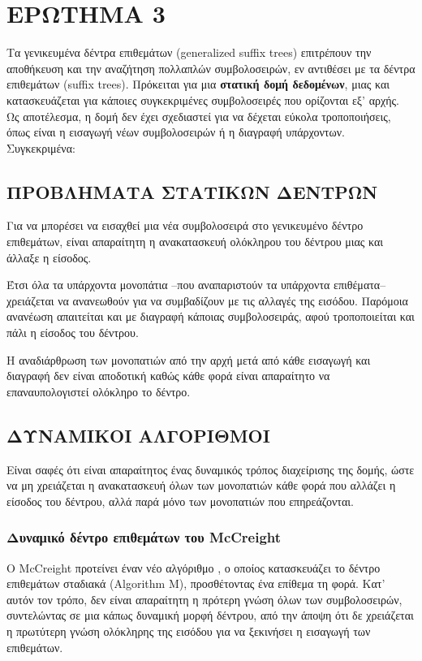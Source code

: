 \chapter{ΕΡΩΤΗΜΑ 3}

    Τα γενικευμένα δέντρα επιθεμάτων (generalized suffix trees) επιτρέπουν την αποθήκευση και την αναζήτηση πολλαπλών συμβολοσειρών, εν αντιθέσει με τα δέντρα επιθεμάτων (suffix trees).
    Πρόκειται για μια \textbf{στατική δομή δεδομένων}, μιας και κατασκευάζεται για κάποιες συγκεκριμένες συμβολοσειρές που ορίζονται εξ' αρχής.
    Ως αποτέλεσμα, η δομή δεν έχει σχεδιαστεί για να δέχεται εύκολα τροποποιήσεις, όπως είναι η εισαγωγή νέων συμβολοσειρών ή η διαγραφή υπάρχοντων. Συγκεκριμένα:

\section{ΠΡΟΒΛΗΜΑΤΑ ΣΤΑΤΙΚΩΝ ΔΕΝΤΡΩΝ}
        Για να μπορέσει να εισαχθεί μια νέα συμβολοσειρά στο γενικευμένο δέντρο επιθεμάτων, είναι απαραίτητη η ανακατασκευή ολόκληρου του δέντρου μιας και άλλαξε η είσοδος.

        Έτσι όλα τα υπάρχοντα μονοπάτια --που αναπαριστούν τα υπάρχοντα επιθέματα-- χρειάζεται να ανανεωθούν για να συμβαδίζουν με τις αλλαγές της εισόδου.
        Παρόμοια ανανέωση απαιτείται και με διαγραφή κάποιας συμβολοσειράς, αφού τροποποιείται και πάλι η είσοδος του δέντρου.

        Η αναδιάρθρωση των μονοπατιών από την αρχή μετά από κάθε εισαγωγή και διαγραφή δεν είναι αποδοτική καθώς κάθε φορά είναι απαραίτητο να επαναυπολογιστεί ολόκληρο το δέντρο.

    \section{ΔΥΝΑΜΙΚΟΙ ΑΛΓΟΡΙΘΜΟΙ}
        Είναι σαφές ότι είναι απαραίτητος ένας δυναμικός τρόπος διαχείρισης της δομής, ώστε να μη χρειάζεται η ανακατασκευή όλων των μονοπατιών κάθε φορά που αλλάζει η είσοδος του δέντρου, αλλά παρά μόνο των μονοπατιών που επηρεάζονται.

        \subsection{Δυναμικό δέντρο επιθεμάτων του McCreight}
            Ο McCreight προτείνει έναν νέο αλγόριθμο \cite{McCreight_1976}, ο οποίος κατασκευάζει το δέντρο επιθεμάτων σταδιακά (Algorithm M), προσθέτοντας ένα επίθεμα τη φορά.
            Κατ' αυτόν τον τρόπο, δεν είναι απαραίτητη η πρότερη γνώση όλων των συμβολοσειρών, συντελώντας σε μια κάπως δυναμική μορφή δέντρου, από την άποψη ότι δε χρειάζεται η πρωτύτερη γνώση ολόκληρης της εισόδου για να ξεκινήσει η εισαγωγή των επιθεμάτων.

